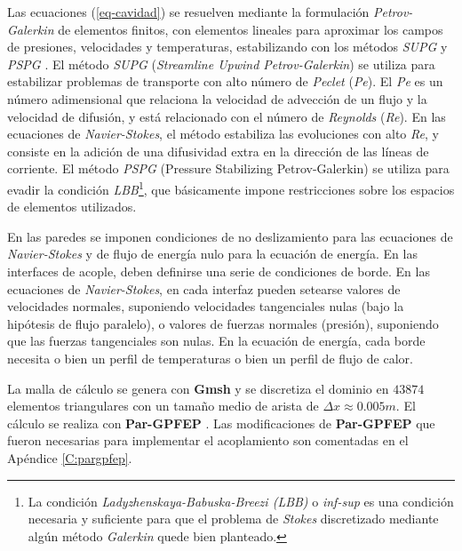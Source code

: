 Las ecuaciones (\ref{eq-cavidad}) se resuelven mediante la formulación \textit{Petrov-Galerkin} \cite{galerkin} de elementos finitos, 
con elementos lineales para aproximar los campos de presiones, velocidades y temperaturas, 
estabilizando con los métodos \textit{SUPG} \cite{supg} y \textit{PSPG} \cite{pspg}.
El método \textit{SUPG} (\textit{Streamline Upwind Petrov-Galerkin}) se utiliza para estabilizar problemas de transporte con alto número de \textit{Peclet} (\textit{Pe}).
El \textit{Pe} es un número adimensional que relaciona la velocidad de advección de un flujo y la velocidad de difusión, y está relacionado con el número de \textit{Reynolds} (\textit{Re}).
En las ecuaciones de \textit{Navier-Stokes}, el método estabiliza las evoluciones con alto \textit{Re},
y consiste en la adición de una difusividad extra en la dirección de las líneas de corriente.
El método \textit{PSPG} (Pressure Stabilizing Petrov-Galerkin) se utiliza para evadir la condición \textit{LBB}\footnote{
La condición \textit{Ladyzhenskaya-Babuska-Breezi (LBB)} o \textit{inf-sup}
es una condición necesaria y suficiente para que el problema de \textit{Stokes}
discretizado mediante algún método \textit{Galerkin}
quede bien planteado.
},
que básicamente impone restricciones sobre los espacios de elementos utilizados.

En las paredes se imponen condiciones de no deslizamiento para las ecuaciones de \textit{Navier-Stokes} y de flujo de energía nulo para la ecuación de energía.
En las interfaces de acople, deben definirse una serie de condiciones de borde.
En las ecuaciones de \textit{Navier-Stokes}, en cada interfaz pueden setearse valores de velocidades normales, suponiendo velocidades tangenciales nulas (bajo la hipótesis de flujo paralelo),
o valores de fuerzas normales (presión), suponiendo que las fuerzas tangenciales son nulas.
En la ecuación de energía, cada borde necesita o bien un perfil de temperaturas o bien un perfil de flujo de calor.

La malla de cálculo se genera con \textbf{Gmsh} \cite{gmsh} y se discretiza el dominio en $43874$ elementos triangulares
con un tamaño medio de arista de $\Delta x \approx 0.005m$.
El cálculo se realiza con \textbf{Par-GPFEP} \cite{gpfep} \cite{pargpfep}.
Las modificaciones de \textbf{Par-GPFEP} que fueron necesarias para implementar el acoplamiento son comentadas en el Apéndice \ref{C:pargpfep}.

